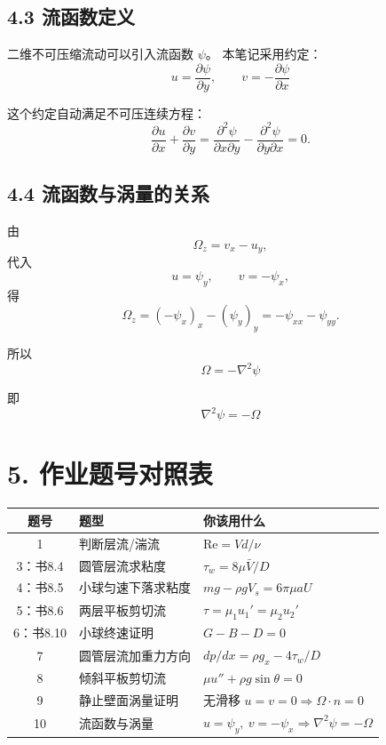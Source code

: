 ﻿\documentclass[12pt,a4paper]{ctexart}
\newcommand{\Rey}{\mathrm{Re}}
\begin{document}
\subsection*{4.3 流函数定义}

二维不可压缩流动可以引入流函数 \(\psi\)。
本笔记采用约定：
\[
\boxed{
u=\frac{\partial\psi}{\partial y},
\qquad
v=-\frac{\partial\psi}{\partial x}
}
\]

这个约定自动满足不可压连续方程：
\[
\frac{\partial u}{\partial x}
+\frac{\partial v}{\partial y}
=
\frac{\partial^2\psi}{\partial x\partial y}
-
\frac{\partial^2\psi}{\partial y\partial x}
=0.
\]

\subsection*{4.4 流函数与涡量的关系}

由
\[
\Omega_z=v_x-u_y,
\]
代入
\[
u=\psi_y,\qquad v=-\psi_x,
\]
得
\[
\Omega_z
=(-\psi_x)_x-(\psi_y)_y
=-\psi_{xx}-\psi_{yy}.
\]

所以
\[
\boxed{
\Omega=-\nabla^2\psi
}
\]

即
\[
\boxed{
\nabla^2\psi=-\Omega
}
\]

\section*{5. 作业题号对照表}

\begin{center}
\begin{tabular}{cll}
\toprule
题号 & 题型 & 你该用什么 \\
\midrule
1 & 判断层流/湍流 & \(\Rey=Vd/\nu\) \\
3：书8.4 & 圆管层流求粘度 & \(\tau_w=8\mu\bar V/D\) \\
4：书8.5 & 小球匀速下落求粘度 & \(mg-\rho gV_s=6\pi\mu aU\) \\
5：书8.6 & 两层平板剪切流 & \(\tau=\mu_1u_1'=\mu_2u_2'\) \\
6：书8.10 & 小球终速证明 & \(G-B-D=0\) \\
7 & 圆管层流加重力方向 & \(dp/dx=\rho g_x-4\tau_w/D\) \\
8 & 倾斜平板剪切流 & \(\mu u''+\rho g\sin\theta=0\) \\
9 & 静止壁面涡量证明 & 无滑移 \(u=v=0\Rightarrow\Omega\cdot n=0\) \\
10 & 流函数与涡量 & \(u=\psi_y,\ v=-\psi_x\Rightarrow\nabla^2\psi=-\Omega\) \\
\bottomrule
\end{tabular}
\end{center}
\end{document}
